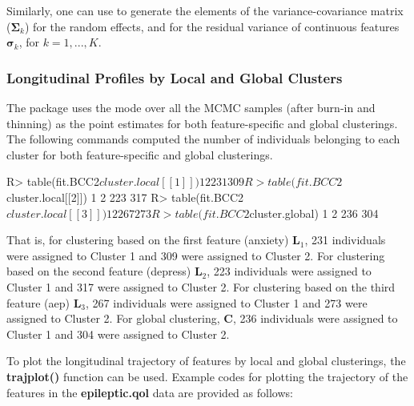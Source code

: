 Similarly, one can use  to generate the elements of the variance-covariance matrix ($\boldsymbol{\Sigma}_k$) for the random effects, and    for the residual variance of continuous features $\boldsymbol{\sigma}_k$, for $k=1,...,K$. 

\subsubsection{Longitudinal Profiles by Local and Global Clusters}

The package uses the mode over all the MCMC samples (after burn-in and thinning) as the point estimates for both feature-specific and global clusterings. The following commands computed the number of individuals belonging to each cluster for both feature-specific and global clusterings. 

\begin{example}
R> table(fit.BCC2$cluster.local[[1]])
  1   2 
231 309 
R> table(fit.BCC2$cluster.local[[2]])
  1   2 
223 317  
R> table(fit.BCC2$cluster.local[[3]])
  1   2 
267 273 
R> table(fit.BCC2$cluster.global)
  1   2 
236 304 
\end{example}

That is, for clustering based on the first feature (anxiety) $\boldsymbol{L}_1$, 231 individuals were assigned to Cluster 1 and 309 were assigned to Cluster 2. For clustering based on the second feature (depress) $\boldsymbol{L}_2$, 223 individuals were assigned to Cluster 1 and 317 were assigned to Cluster 2. For clustering based on the third feature (aep) $\boldsymbol{L}_3$, 267 individuals were assigned to Cluster 1 and 273 were assigned to Cluster 2. For global clustering, $\boldsymbol{C}$, 236 individuals were assigned to Cluster 1 and 304 were assigned to Cluster 2.

To plot the longitudinal trajectory of features by local and global clusterings, the \textbf{trajplot()} function can be used. Example codes for plotting the trajectory of the features in the \textbf{epileptic.qol} data are provided as follows: 

